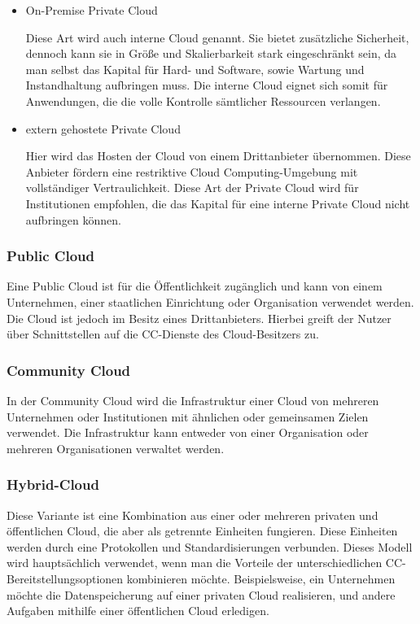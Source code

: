\begin{itemize}
    \item On-Premise Private Cloud
    \begin{sloppypar}
        Diese Art wird auch interne Cloud genannt. Sie bietet zusätzliche Sicherheit, dennoch kann sie in Größe und Skalierbarkeit stark eingeschränkt sein, da man selbst das Kapital für Hard- und Software, sowie Wartung und Instandhaltung aufbringen muss. Die interne Cloud eignet sich somit für Anwendungen, die die volle Kontrolle sämtlicher Ressourcen verlangen.
    \end{sloppypar}
    \item extern gehostete Private Cloud
    \begin{sloppypar} 
        Hier wird das Hosten der Cloud von einem Drittanbieter übernommen. Diese Anbieter fördern eine restriktive Cloud Computing-Umgebung mit vollständiger Vertraulichkeit. Diese Art der Private Cloud wird für Institutionen empfohlen, die das Kapital für eine interne Private Cloud nicht aufbringen können.
    \end{sloppypar} 
\end{itemize}

\subsubsection{Public Cloud}

Eine Public Cloud ist für die Öffentlichkeit zugänglich und kann von einem Unternehmen, einer staatlichen Einrichtung oder Organisation verwendet werden. Die Cloud ist jedoch im Besitz eines Drittanbieters. Hierbei greift der Nutzer über Schnittstellen auf die CC-Dienste des Cloud-Besitzers zu.

\subsubsection{Community Cloud}

In der Community Cloud wird die Infrastruktur einer Cloud von mehreren Unternehmen oder Institutionen mit ähnlichen oder gemeinsamen Zielen verwendet. Die Infrastruktur kann entweder von einer Organisation oder mehreren Organisationen verwaltet werden.

\subsubsection{Hybrid-Cloud}

Diese Variante ist eine Kombination aus einer oder mehreren privaten und öffentlichen Cloud, die aber als getrennte Einheiten fungieren. Diese Einheiten werden durch eine Protokollen und Standardisierungen verbunden. Dieses Modell wird hauptsächlich verwendet, wenn man die Vorteile der unterschiedlichen CC-Bereitstellungsoptionen kombinieren möchte. Beispielsweise, ein Unternehmen möchte die Datenspeicherung auf einer privaten Cloud realisieren, und andere Aufgaben mithilfe einer öffentlichen Cloud erledigen.

